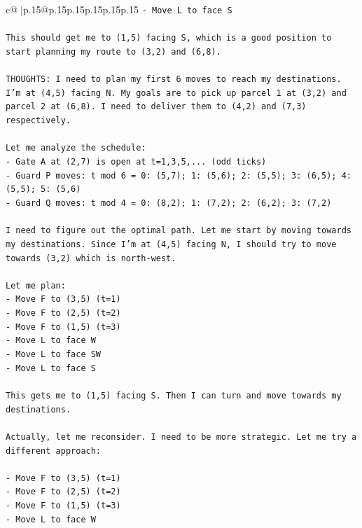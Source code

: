 \documentclass{article}
\begin{document}
{\begin{supertabular}{c@{$\;$}|p{.15\linewidth}@{}p{.15\linewidth}p{.15\linewidth}p{.15\linewidth}p{.15\linewidth}p{.15\linewidth}}
{{{\texttt{{-} Move L to face S} \\
\\ 
\texttt{This should get me to (1,5) facing S, which is a good position to start planning my route to (3,2) and (6,8).} \\
\\ 
\texttt{THOUGHTS: I need to plan my first 6 moves to reach my destinations. I'm at (4,5) facing N. My goals are to pick up parcel 1 at (3,2) and parcel 2 at (6,8). I need to deliver them to (4,2) and (7,3) respectively.} \\
\\ 
\texttt{Let me analyze the schedule:} \\
\texttt{{-} Gate A at (2,7) is open at t=1,3,5,... (odd ticks)} \\
\texttt{{-} Guard P moves: t mod 6 = 0: (5,7); 1: (5,6); 2: (5,5); 3: (6,5); 4: (5,5); 5: (5,6)} \\
\texttt{{-} Guard Q moves: t mod 4 = 0: (8,2); 1: (7,2); 2: (6,2); 3: (7,2)} \\
\\ 
\texttt{I need to figure out the optimal path. Let me start by moving towards my destinations. Since I'm at (4,5) facing N, I should try to move towards (3,2) which is north{-}west.} \\
\\ 
\texttt{Let me plan:} \\
\texttt{{-} Move F to (3,5) (t=1)} \\
\texttt{{-} Move F to (2,5) (t=2)} \\
\texttt{{-} Move F to (1,5) (t=3)} \\
\texttt{{-} Move L to face W} \\
\texttt{{-} Move L to face SW} \\
\texttt{{-} Move L to face S} \\
\\ 
\texttt{This gets me to (1,5) facing S. Then I can turn and move towards my destinations.} \\
\\ 
\texttt{Actually, let me reconsider. I need to be more strategic. Let me try a different approach:} \\
\\ 
\texttt{{-} Move F to (3,5) (t=1)} \\
\texttt{{-} Move F to (2,5) (t=2)} \\
\texttt{{-} Move F to (1,5) (t=3)} \\
\texttt{{-} Move L to face W} \\
}}}
\end{supertabular}}
\end{document}
